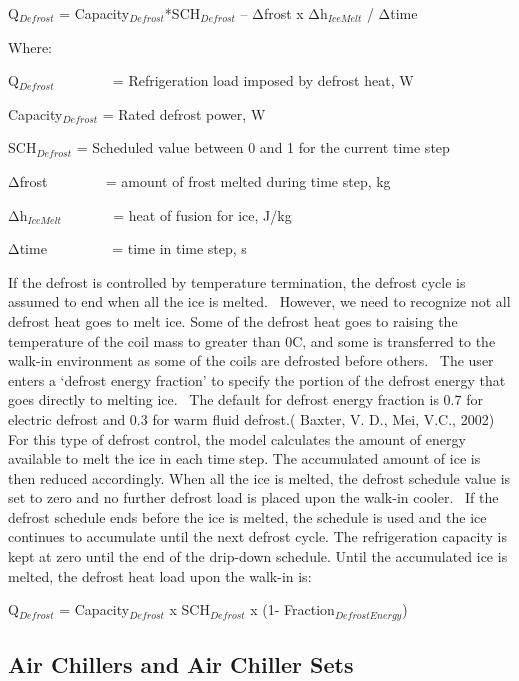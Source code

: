 Q\(_{Defrost}\) = Capacity\(_{Defrost}\)*SCH\(_{Defrost}\) -- Δfrost x Δh\(_{IceMelt}\) / Δtime

Where:

Q\(_{Defrost}\) ~~~~~~~ = Refrigeration load imposed by defrost heat, W

Capacity\(_{Defrost}\) = Rated defrost power, W

SCH\(_{Defrost}\) = Scheduled value between 0 and 1 for the current time step

Δfrost ~~~~~~~ = amount of frost melted during time step, kg

Δh\(_{IceMelt}\) ~~~~~~ = heat of fusion for ice, J/kg

Δtime ~~~~~~~~ = time in time step, s

If the defrost is controlled by temperature termination, the defrost cycle is assumed to end when all the ice is melted.~ However, we need to recognize not all defrost heat goes to melt ice. Some of the defrost heat goes to raising the temperature of the coil mass to greater than 0C, and some is transferred to the walk-in environment as some of the coils are defrosted before others.~ The user enters a `defrost energy fraction' to specify the portion of the defrost energy that goes directly to melting ice.~ The default for defrost energy fraction is 0.7 for electric defrost and 0.3 for warm fluid defrost.( Baxter, V. D., Mei, V.C., 2002) For this type of defrost control, the model calculates the amount of energy available to melt the ice in each time step. The accumulated amount of ice is then reduced accordingly. When all the ice is melted, the defrost schedule value is set to zero and no further defrost load is placed upon the walk-in cooler.~ If the defrost schedule ends before the ice is melted, the schedule is used and the ice continues to accumulate until the next defrost cycle. The refrigeration capacity is kept at zero until the end of the drip-down schedule. Until the accumulated ice is melted, the defrost heat load upon the walk-in is:

Q\(_{Defrost}\) = Capacity\(_{Defrost}\) x SCH\(_{Defrost}\) x (1- Fraction\(_{DefrostEnergy}\))

\subsection{Air Chillers and Air Chiller Sets}\label{air-chillers-and-air-chiller-sets}

